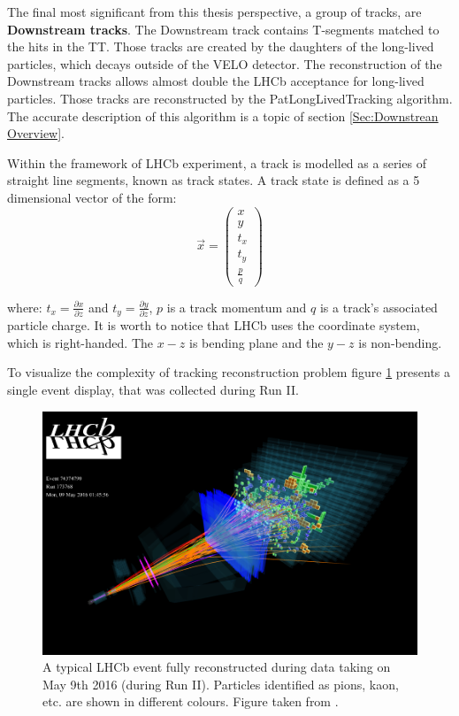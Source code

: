 The final most significant from this thesis perspective, a group of tracks, are \textbf{Downstream tracks}. The Downstream track contains T-segments matched to the hits in the TT. Those tracks are created by the daughters of the long-lived particles, which decays outside of the VELO detector. The reconstruction of the Downstream tracks allows almost double the LHCb acceptance for long-lived particles. Those tracks are reconstructed by the PatLongLivedTracking algorithm. 
The accurate description of this algorithm is a topic of section \ref{Sec:Downstrean Overview}. 

Within the framework of LHCb experiment, a track is modelled as a series of straight line segments, known as track states. A track state is defined as a 5 dimensional vector of the form:
\begin{equation}
    \vec{x} = \begin{pmatrix}
    x \\ y \\ t_{x} \\ t_{y} \\ \frac{p}{q} 
    \end{pmatrix}
\end{equation}

where: $t_x = \frac{\partial x}{\partial z}$ and $t_y = \frac{\partial y}{\partial z}$, $p$ is a track momentum and $q$ is a track's associated particle charge. It is worth to notice that LHCb uses the coordinate system, which is right-handed. The $x-z$ is bending plane and the $y-z$ is non-bending. 


To visualize the complexity of tracking reconstruction problem figure \ref{fig:event display} presents a single event display, that was collected during Run II.   




\begin{figure}[h]
\centering
\includegraphics[scale=0.9]{figures/LHCb7_event.png}
\caption{A typical LHCb event fully reconstructed during data taking on May 9th 2016 (during Run II). Particles identified as pions, kaon, etc. are shown in different colours. Figure taken from \cite{LHCb_event_display}.
\label{fig:event display}}
\end{figure}


